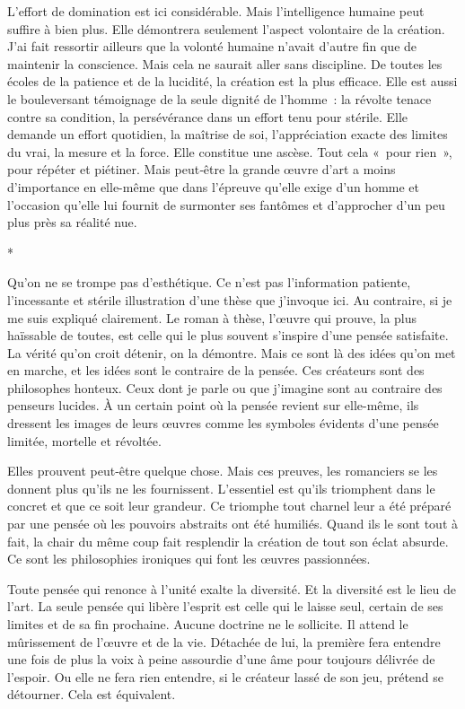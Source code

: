 \documentclass{book}
\begin{document}
L'effort de domination est ici considérable. Mais l'intelligence humaine peut suffire à bien plus. Elle démontrera seulement l'aspect volontaire de la création. J'ai fait ressortir ailleurs que la volonté humaine n'avait d'autre fin que de maintenir la conscience. Mais cela ne saurait aller sans discipline. De toutes les écoles de la patience et de la lucidité, la création est la plus efficace. Elle est aussi le bouleversant témoignage de la seule dignité de l'homme : la révolte tenace contre sa condition, la persévérance dans un effort tenu pour stérile. Elle demande un effort quotidien, la maîtrise de soi, l'appréciation exacte des limites du vrai, la mesure et la force. Elle constitue une ascèse. Tout cela « pour rien », pour répéter et piétiner. Mais peut‑être la grande œuvre d'art a moins d'importance en elle-même que dans l'épreuve qu'elle exige d'un homme et l'occasion qu'elle lui fournit de surmonter ses fantômes et d'approcher d'un peu plus près sa réalité nue.

\begin{center}
*
\end{center}

Qu'on ne se trompe pas d'esthétique. Ce n'est pas l'information patiente, l'incessante et stérile illustration d'une thèse que j'invoque ici. Au contraire, si je me suis expliqué clairement. Le roman à thèse, l'œuvre qui prouve, la plus haïssable de toutes, est celle qui le plus souvent s'inspire d'une pensée satisfaite. La vérité qu'on croit détenir, on la démontre. Mais ce sont là des idées qu'on met en marche, et les idées sont le contraire de la pensée. Ces créateurs sont des philosophes honteux. Ceux dont je parle ou que j'imagine sont au contraire des penseurs lucides. À un certain point où la pensée revient sur elle-même, ils dressent les images de leurs œuvres comme les symboles évidents d'une pensée limitée, mortelle et révoltée.

Elles prouvent peut‑être quelque chose. Mais ces preuves, les romanciers se les donnent plus qu'ils ne les fournissent. L'essentiel est qu'ils triomphent dans le concret et que ce soit leur grandeur. Ce triomphe tout charnel leur a été préparé par une pensée où les pouvoirs abstraits ont été humiliés. Quand ils le sont tout à fait, la chair du même coup fait resplendir la création de tout son éclat absurde. Ce sont les philosophies ironiques qui font les œuvres passionnées.

Toute pensée qui renonce à l'unité exalte la diversité. Et la diversité est le lieu de l'art. La seule pensée qui libère l'esprit est celle qui le laisse seul, certain de ses limites et de sa fin prochaine. Aucune doctrine ne le sollicite. Il attend le mûrissement de l'œuvre et de la vie. Détachée de lui, la première fera entendre une fois de plus la voix à peine assourdie d'une âme pour toujours délivrée de l'espoir. Ou elle ne fera rien entendre, si le créateur lassé de son jeu, prétend se détourner. Cela est équivalent.
\end{document}
